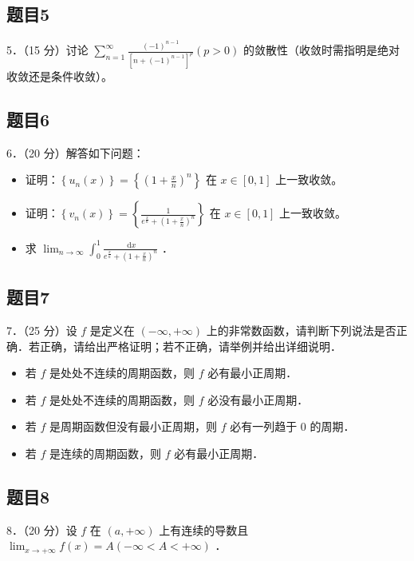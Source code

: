\documentclass{article}
\begin{document}
\subsection{题目5}
5．（15 分）讨论 \(\sum_{n=1}^{\infty} \frac{(-1)^{n-1}}{\left[n+(-1)^{n-1}\right]^{p}}(p>0)\) 的敛散性（收敛时需指明是绝对收敛还是条件收敛）。

\subsection{题目6}
6．（20 分）解答如下问题：

\begin{itemize}
  \item[（1）] 证明：\(\left\{u_{n}(x)\right\}=\left\{\left(1+\frac{x}{n}\right)^{n}\right\}\) 在 \(x \in[0,1]\) 上一致收敛。
  \item[（2）] 证明：\(\left\{v_{n}(x)\right\}=\left\{\frac{1}{e^{\frac{x}{n}}+\left(1+\frac{x}{n}\right)^{n}}\right\}\) 在 \(x \in[0,1]\) 上一致收敛。
  \item[（3）] 求 \(\lim _{n \rightarrow \infty} \int_{0}^{1} \frac{\mathrm{~d} x}{e^{\frac{x}{n}}+\left(1+\frac{x}{n}\right)^{n}}\) ．
\end{itemize}

\subsection{题目7}
7．（25 分）设 \(f\) 是定义在 \((-\infty,+\infty)\) 上的非常数函数，请判断下列说法是否正确．若正确，请给出严格证明；若不正确，请举例并给出详细说明．

\begin{itemize}
  \item[（1）] 若 \(f\) 是处处不连续的周期函数，则 \(f\) 必有最小正周期．
  \item[（2）] 若 \(f\) 是处处不连续的周期函数，则 \(f\) 必没有最小正周期．
  \item[（3）] 若 \(f\) 是周期函数但没有最小正周期，则 \(f\) 必有一列趋于 0 的周期．
  \item[（4）] 若 \(f\) 是连续的周期函数，则 \(f\) 必有最小正周期．
\end{itemize}

\subsection{题目8}
8．（20 分）设 \(f\) 在 \((a,+\infty)\) 上有连续的导数且 \(\lim _{x \rightarrow+\infty} f(x)=A(-\infty<A<+\infty)\) ．
\end{document}
